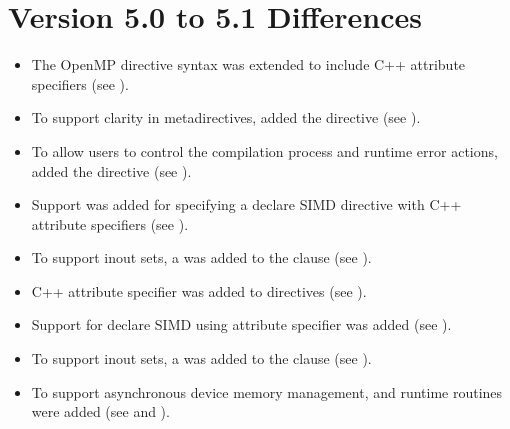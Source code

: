 \section{Version 5.0 to 5.1 Differences}
\label{sec:Version 5.0 to 5.1 Differences}
\begin{itemize}
\item The OpenMP directive syntax was extended to include C++ attribute
      specifiers (see ).

\item To support clarity in metadirectives, added the  
      directive (see ).

\item To allow users to control the compilation process and runtime error 
      actions, added the  directive 
      (see ).

\item Support was added for specifying a declare SIMD directive with C++ attribute
      specifiers (see ).

\item To support inout sets, a   was
      added to the  clause (see ).

\item C++ attribute specifier was added to directives (see ).

\item Support for declare SIMD using attribute specifier was added (see ).

\item To support inout sets, a   was
      added to the  clause (see ).

\item To support asynchronous device memory management,
   and
   runtime routines were added (see
   and
  ).
\end{itemize}


